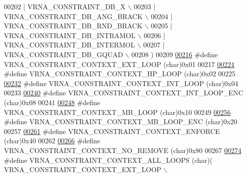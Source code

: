\begin{DoxyCode}
00202 \textcolor{preprocessor}{      | VRNA\_CONSTRAINT\_DB\_X \(\backslash\)}
00203 \textcolor{preprocessor}{      | VRNA\_CONSTRAINT\_DB\_ANG\_BRACK \(\backslash\)}
00204 \textcolor{preprocessor}{      | VRNA\_CONSTRAINT\_DB\_RND\_BRACK \(\backslash\)}
00205 \textcolor{preprocessor}{      | VRNA\_CONSTRAINT\_DB\_INTRAMOL \(\backslash\)}
00206 \textcolor{preprocessor}{      | VRNA\_CONSTRAINT\_DB\_INTERMOL \(\backslash\)}
00207 \textcolor{preprocessor}{      | VRNA\_CONSTRAINT\_DB\_GQUAD \(\backslash\)}
00208 \textcolor{preprocessor}{    )}
00209 
\hypertarget{constraints__hard_8h_source.tex_l00216}{}\hyperlink{group__hard__constraints_ga9418eda62a5dec070896702c279d2548}{00216} \textcolor{preprocessor}{#define VRNA\_CONSTRAINT\_CONTEXT\_EXT\_LOOP      (char)0x01}
00217 
\hypertarget{constraints__hard_8h_source.tex_l00224}{}\hyperlink{group__hard__constraints_ga79203702b197b6b9d3b78eed40663eb1}{00224} \textcolor{preprocessor}{#define VRNA\_CONSTRAINT\_CONTEXT\_HP\_LOOP       (char)0x02}
00225 
\hypertarget{constraints__hard_8h_source.tex_l00232}{}\hyperlink{group__hard__constraints_ga21feeab3a9e5fa5a9e3d9ac0fcf5994f}{00232} \textcolor{preprocessor}{#define VRNA\_CONSTRAINT\_CONTEXT\_INT\_LOOP      (char)0x04}
00233 
\hypertarget{constraints__hard_8h_source.tex_l00240}{}\hyperlink{group__hard__constraints_ga0536288e04ff6332ecdc23ca4705402b}{00240} \textcolor{preprocessor}{#define VRNA\_CONSTRAINT\_CONTEXT\_INT\_LOOP\_ENC  (char)0x08}
00241 
\hypertarget{constraints__hard_8h_source.tex_l00248}{}\hyperlink{group__hard__constraints_ga456ecd2ff00056bb64da8dd4f61bbfc5}{00248} \textcolor{preprocessor}{#define VRNA\_CONSTRAINT\_CONTEXT\_MB\_LOOP       (char)0x10}
00249 
\hypertarget{constraints__hard_8h_source.tex_l00256}{}\hyperlink{group__hard__constraints_ga02a3d703ddbcfce393e4bbfcb9db7077}{00256} \textcolor{preprocessor}{#define VRNA\_CONSTRAINT\_CONTEXT\_MB\_LOOP\_ENC   (char)0x20}
00257 
\hypertarget{constraints__hard_8h_source.tex_l00261}{}\hyperlink{constraints__hard_8h_a1aa55f2c6347e670e003b1a765632dad}{00261} \textcolor{preprocessor}{#define VRNA\_CONSTRAINT\_CONTEXT\_ENFORCE       (char)0x40}
00262 
\hypertarget{constraints__hard_8h_source.tex_l00266}{}\hyperlink{constraints__hard_8h_a9fcac36535850ff612c7e6b1305304a1}{00266} \textcolor{preprocessor}{#define VRNA\_CONSTRAINT\_CONTEXT\_NO\_REMOVE     (char)0x80}
00267 
\hypertarget{constraints__hard_8h_source.tex_l00274}{}\hyperlink{group__hard__constraints_ga886d9127c49bb982a4b67cd7581e8a5a}{00274} \textcolor{preprocessor}{#define VRNA\_CONSTRAINT\_CONTEXT\_ALL\_LOOPS     (char)(   VRNA\_CONSTRAINT\_CONTEXT\_EXT\_LOOP \(\backslash\)}

\end{DoxyCode}
